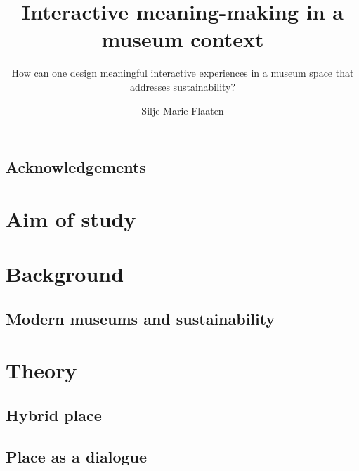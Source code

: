 \documentclass[UKenglish]{ifimaster}
\title{Interactive meaning-making in a museum context}
\subtitle{How can one design meaningful interactive experiences in a museum space that addresses sustainability?}
\author{Silje Marie Flaaten}
\begin{document}
\duoforside[dept={Department of Informatics}, program={Informatics: design, use, interaction},long]



\frontmatter{}
\chapter*{Acknowledgements}


%

\tableofcontents{}
\listoffigures{}

% 

\mainmatter{}
\part{Aim of study}


\part{Background}
\chapter{Modern museums and sustainability}


% 


\part{Theory}

\chapter{Hybrid place}

\chapter{Place as a dialogue}

\end{document}
